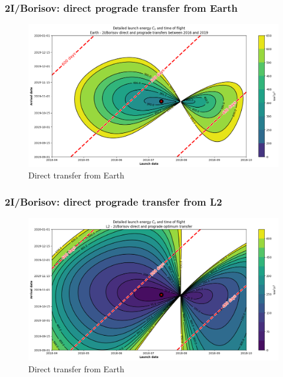 \documentclass[xcolor={dvipsnames}]{beamer}
\begin{document}
\begin{frame}
\frametitle{2I/Borisov: direct prograde transfer from Earth}

\begin{figure}[h]
    \centering
    \includegraphics[width=\textwidth]{fig/static/borisov/direct-detailed-porkchop-tof.png}
    \caption{Direct transfer from Earth}
    \label{fig:borisov-earth-transfer}
\end{figure}

\end{frame}

\begin{frame}
\frametitle{2I/Borisov: direct prograde transfer from L2}

\begin{figure}[h]
    \centering
    \includegraphics[width=\textwidth]{fig/static/borisov/l2-direct-detailed-porkchop-tof.png}
    \caption{Direct transfer from Earth}
    \label{fig:borisov-l2-transfer}
\end{figure}

\end{frame}
\end{document}
